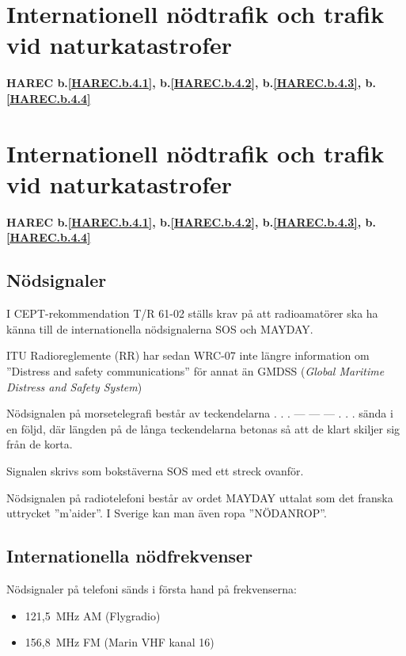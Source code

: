 \section{Internationell nödtrafik och trafik vid naturkatastrofer}
\textbf{
	HAREC b.\ref{HAREC.b.4.1}\label{myHAREC.b.4.1},
	b.\ref{HAREC.b.4.2}\label{myHAREC.b.4.2},
	b.\ref{HAREC.b.4.3}\label{myHAREC.b.4.3},
	b.\ref{HAREC.b.4.4}\label{myHAREC.b.4.4}
}

\section{Internationell nödtrafik och trafik vid naturkatastrofer}
\textbf{
	HAREC b.\ref{HAREC.b.4.1}\label{myHAREC.b.4.1},
	b.\ref{HAREC.b.4.2}\label{myHAREC.b.4.2},
	b.\ref{HAREC.b.4.3}\label{myHAREC.b.4.3},
	b.\ref{HAREC.b.4.4}\label{myHAREC.b.4.4}
}

\subsection{Nödsignaler}

I CEPT-rekommendation T/R 61-02 ställs krav på att radioamatörer ska ha känna
till de internationella nödsignalerna SOS och MAYDAY.

ITU Radioreglemente (RR) har sedan WRC-07 inte längre information om
''Distress and safety communications'' för annat än GMDSS (\emph{Global Maritime Distress and Safety System})

Nödsignalen på morsetelegrafi består av teckendelarna . . . --- --- --- . . .
sända i en följd, där längden på de långa teckendelarna betonas så att de klart
skiljer sig från de korta.

Signalen skrivs som bokstäverna SOS med ett streck ovanför.

Nödsignalen på radiotelefoni består av ordet MAYDAY uttalat som det franska
uttrycket ''m'aider''. I Sverige kan man även ropa ''NÖDANROP''.

\subsection{Internationella nödfrekvenser}

Nödsignaler på telefoni sänds i första hand på frekvenserna:
\begin{itemize}
	\item 121,5~MHz AM (Flygradio)
	\item 156,8~MHz FM (Marin VHF kanal 16)
\end{itemize}

